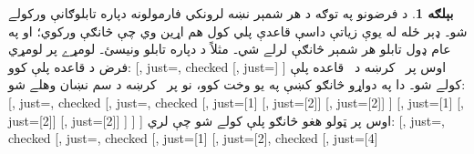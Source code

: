 \documentclass[12pt,a4paper,oneside]{report}
\newenvironment{oltableau}
  {\center\LTR\tableau{}}
  {\endtableau\endLTR\endcenter}
\theoremstyle{definition}
\newtheorem{ex}[thm]{بېلګه}
\begin{document}
\label{olpseg:OLP-0103-B012:start}
\begin{ex}
د فرضونو په توګه د هر شمېر نښه لرونکي فارمولونه دپاره
تابلوګانې ورکولے شو۔ ډېر ځله له يوې زياتې داسې قاعدې پلي کول هم
اړين وي چې څانګې ورکوي؛ او په عام ډول تابلو هر شمېر څانګې
لرلے شي۔ مثلاً د
 دپاره تابلو ونيسئ۔ لومړے پر لومړي فرض د
\LR{$\TRule{\True}{\lor}$} قاعده پلې کوو:
\begin{oltableau}
  [,
    just=\TAss, checked
    [, just=\TAss
      [\sFmla{\True}{\formula{A}}, just={\TRule{\True}{\lor}[1]}]
      [\sFmla{\True}{\formula{B} \land \formula{C}},
        just={\TRule{\True}{\lor}[1]}]
    ]
  ]
\end{oltableau}
اوس پر~ کرښه د~\LR{$\TRule{\False}{\land}$} قاعده پلې کولے
شو۔ دا په دواړو څانګو کښې په يو وخت کوو، نو پر~ کرښه د سم نښان
وهلے شو:
\begin{oltableau}
  [,
    just=\TAss, checked
    [, just=\TAss, checked
      [, just={\TRule{\True}{\lor}[1]}
        [,
          just={\TRule{\False}{\land}[2]}]
        [,
          just={\TRule{\False}{\land}[2]}]
      ]
      [,
        just={\TRule{\True}{\lor}[1]}
        [,
          just={\TRule{\False}{\land}[2]}]
        [,
          just={\TRule{\False}{\land}[2]}]
      ]
    ]
  ]
\end{oltableau}
اوس \LR{$\TRule{\False}{\lor}$} پر ټولو هغو څانګو پلې کولے شو چې
 لري:
\begin{oltableau}
  [,
    just=\TAss, checked
    [, just=\TAss, checked
      [, just={\TRule{\True}{\lor}[1]}
        [,
          just={\TRule{\False}{\land}[2]}, checked
          [, just={\TRule{\False}{\lor}[4]}

\end{oltableau}
\end{ex}
\end{document}
